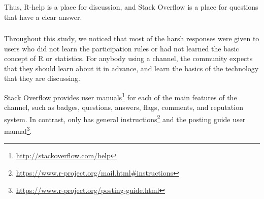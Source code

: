 

Thus, R-help is a place for discussion, and Stack Overflow is a place for questions that have a clear answer.


\subsubsection{\recb}

    Throughout this study, we noticed that most of the harsh responses were given to users who did not learn the participation rules or had not learned the basic concept of R or statistics.
    For anybody using a channel, the community expects that they should learn about it in advance, and learn the basics of the technology that they are discussing.


    Stack Overflow provides user manuals\footnote{\url{http://stackoverflow.com/help}} for each of the main features of the channel, such as badges, questions,
    answers, flags, comments, and reputation system.     In contrast, \RH only has general instructions\footnote{\url{https://www.r-project.org/mail.html\#instructions}} and the posting guide user manual\footnote{\url{https://www.r-project.org/posting-guide.html}}.


